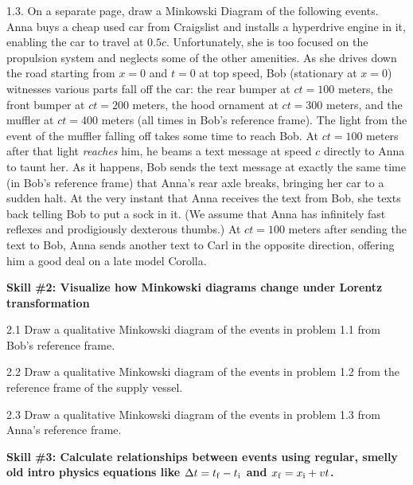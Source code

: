 1.3. On a separate page, draw a Minkowski Diagram of the following events.  Anna buys a cheap used car from Craigslist and installs a hyperdrive engine in it, enabling the car to travel at $0.5 c$.  Unfortunately, she is too focused on the propulsion system and neglects some of the other amenities.  
As she drives down the road starting from $x=0$ and $t=0$ at top speed, Bob (stationary at $x=0$) witnesses various parts fall off the car: 
the rear bumper at $ct=100$ meters, the front bumper at $ct=200$ meters, the hood ornament at $ct=300$ meters, and the muffler at $ct=400$ meters (all times in Bob's reference frame).  
The light from the event of the muffler falling off takes some time to reach Bob.  
At $ct=100$ meters after that light \textit{reaches} him, he beams a text message at speed $c$ directly to Anna to taunt her.  As it happens, Bob sends the text message at exactly the same time (in Bob's reference frame) that Anna's rear axle breaks, bringing her car to a sudden halt.  At the very instant that Anna receives the text from Bob, she texts back telling Bob to put a sock in it.  (We assume that Anna has infinitely fast reflexes and prodigiously dexterous thumbs.)  
At $ct=100$ meters after sending the text to Bob, Anna sends another text to Carl in the opposite direction, offering him a good deal on a late model Corolla.  
\bigskip



\textbf{Skill \#2: Visualize how Minkowski diagrams change under Lorentz transformation}

2.1 Draw a qualitative Minkowski diagram of the events in problem 1.1 from Bob's reference frame.  
\bigskip

2.2 Draw a qualitative Minkowski diagram of the events in problem 1.2 from the reference frame of the supply vessel.  
\bigskip

2.3 Draw a qualitative Minkowski diagram of the events in problem 1.3 from Anna's reference frame.  
\bigskip
\bigskip

\pagebreak



\textbf{Skill \#3: Calculate relationships between events using regular, smelly old intro physics equations like \boldmath$ \Delta t=t_{\rm f}-t_{\rm i}$ and \boldmath${x_{\rm f}=x_{\rm i}+vt}$.}

